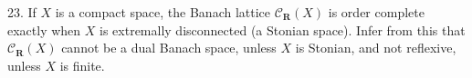 23. If $X$ is a compact space, the Banach lattice $\mathcal{C}_{\mathbf{R}}(X)$ is order complete exactly when $X$ is extremally disconnected (a Stonian space). Infer from this that $\mathcal{C}_{\mathbf{R}}(X)$ cannot be a dual Banach space, unless $X$ is Stonian, and not reflexive, unless $X$ is finite.
